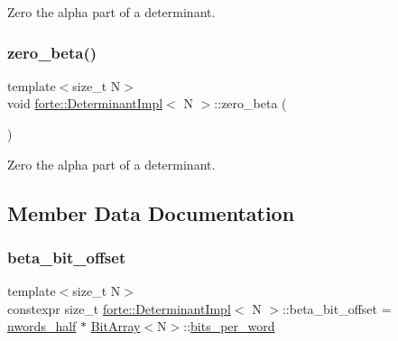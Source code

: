 Zero the alpha part of a determinant. 

\mbox{\label{classforte_1_1_determinant_impl_aeca8e43710bad20561193304aee10c9b}} 
\subsubsection{\texorpdfstring{zero\+\_\+beta()}{zero\_beta()}}
{\footnotesize\ttfamily template$<$size\+\_\+t N$>$ \\
void \mbox{\hyperlink{classforte_1_1_determinant_impl}{forte\+::\+Determinant\+Impl}}$<$ N $>$\+::zero\+\_\+beta (\begin{DoxyParamCaption}{ }\end{DoxyParamCaption})\hspace{0.3cm}{\ttfamily [inline]}}



Zero the alpha part of a determinant. 



\subsection{Member Data Documentation}
\mbox{\label{classforte_1_1_determinant_impl_aae5a6637a75d4c47513e906c60857f2b}} 
\subsubsection{\texorpdfstring{beta\+\_\+bit\+\_\+offset}{beta\_bit\_offset}}
{\footnotesize\ttfamily template$<$size\+\_\+t N$>$ \\
constexpr size\+\_\+t \mbox{\hyperlink{classforte_1_1_determinant_impl}{forte\+::\+Determinant\+Impl}}$<$ N $>$\+::beta\+\_\+bit\+\_\+offset = \mbox{\hyperlink{classforte_1_1_determinant_impl_a7474c95c308be22daaa9cd26aed8a035}{nwords\+\_\+half}} $\ast$ \mbox{\hyperlink{classforte_1_1_bit_array}{Bit\+Array}}$<$N$>$\+::\mbox{\hyperlink{classforte_1_1_bit_array_ad5ca62ac879b44e0e28017a73fd6c3fd}{bits\+\_\+per\+\_\+word}}\hspace{0.3cm}{\ttfamily [static]}}



